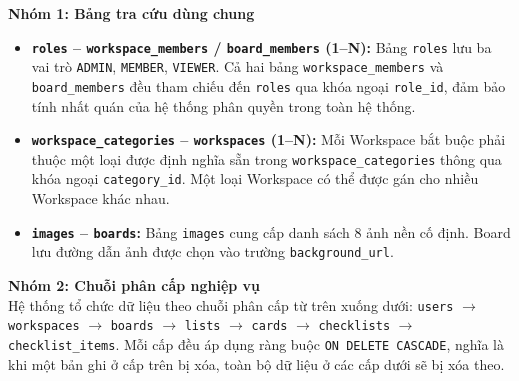 \textbf{Nhóm 1: Bảng tra cứu dùng chung}

\begin{itemize}
    \item \textbf{\texttt{roles} -- \texttt{workspace\_members} / \texttt{board\_members} (1--N):} Bảng \texttt{roles} lưu ba vai trò \texttt{ADMIN}, \texttt{MEMBER}, \texttt{VIEWER}. Cả hai bảng \texttt{workspace\_members} và \texttt{board\_members} đều tham chiếu đến \texttt{roles} qua khóa ngoại \texttt{role\_id}, đảm bảo tính nhất quán của hệ thống phân quyền trong toàn hệ thống.
    \item \textbf{\texttt{workspace\_categories} -- \texttt{workspaces} (1--N):} Mỗi Workspace bắt buộc phải thuộc một loại được định nghĩa sẵn trong \texttt{workspace\_categories} thông qua khóa ngoại \texttt{category\_id}. Một loại Workspace có thể được gán cho nhiều Workspace khác nhau.
    \item \textbf{\texttt{images} -- \texttt{boards}:} Bảng \texttt{images} cung cấp danh sách 8 ảnh nền cố định. Board lưu đường dẫn ảnh được chọn vào trường \texttt{background\_url}.
\end{itemize}

\textbf{Nhóm 2: Chuỗi phân cấp nghiệp vụ} \\

Hệ thống tổ chức dữ liệu theo chuỗi phân cấp từ trên xuống dưới: \texttt{users} $\rightarrow$ \texttt{workspaces} $\rightarrow$ \texttt{boards} $\rightarrow$ \texttt{lists} $\rightarrow$ \texttt{cards} $\rightarrow$ \texttt{checklists} $\rightarrow$ \texttt{checklist\_items}. Mỗi cấp đều áp dụng ràng buộc \texttt{ON DELETE CASCADE}, nghĩa là khi một bản ghi ở cấp trên bị xóa, toàn bộ dữ liệu ở các cấp dưới sẽ bị xóa theo.

